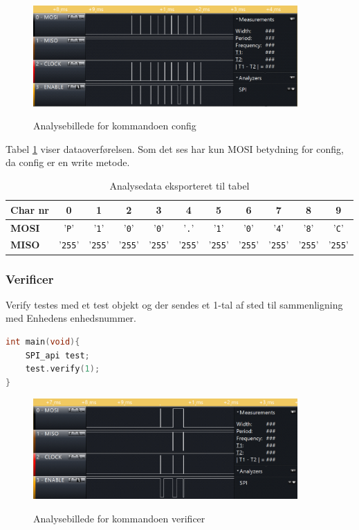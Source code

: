 \begin{figure}[H]
\centering
{\includegraphics[width=0.90\textwidth]{filer/integrationstest/billeder/spi_config}}
\caption{Analysebillede for kommandoen config}
\label{lab:scop_config}
\end{figure}

Tabel \ref{table:scop_config} viser dataoverførelsen. Som det ses har kun MOSI betydning for config, da config er en write metode. 

\begin{table}[H]
	\caption{Analysedata eksporteret til tabel}
	\centering
	\begin{tabular}{|l|c|c|c|c|c|c|c|c|c|c|}
		\hline 
		\textbf{Char nr} & \textbf{0} & \textbf{1} & \textbf{2} & \textbf{3} & \textbf{4} & \textbf{5} 
						 & \textbf{6} & \textbf{7} & \textbf{8} & \textbf{9}\\ 		
		\hline 
		\textbf{MOSI} & '\verb+P+' & '\verb+1+' & '\verb+0+' & '\verb+0+' & '\verb+.+' & '\verb+1+' 
						& '\verb+0+' & '\verb+4+' & '\verb+8+' & '\verb+C+' \\ 
		\hline 
		\textbf{MISO} & '\verb+255+' & '\verb+255+' & '\verb+255+' & '\verb+255+' & '\verb+255+' & '\verb+255+' 
						& '\verb+255+' & '\verb+255+' & '\verb+255+' & '\verb+255+' \\ 
		\hline 
	\end{tabular} 
	\label{table:scop_config}
\end{table}


\subsubsection*{Verificer}
Verify testes med et test objekt og der sendes et 1-tal af sted til sammenligning med Enhedens enhedsnummer.

\begin{lstlisting}[language=C]
int main(void){
	SPI_api test;	
	test.verify(1);
}
\end{lstlisting}

\begin{figure}[H]
\centering
{\includegraphics[width=0.90\textwidth]{filer/integrationstest/billeder/spi_verify}}
\caption{Analysebillede for kommandoen verificer}
\label{lab:scop_verify}
\end{figure}

